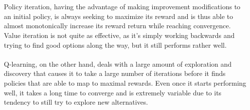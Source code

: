 \documentclass[h]{article}
\begin{document}
\\ \\
Policy iteration, having the advantage of making improvement modifications to an 
initial policy, is always seeking to maximize its reward and is thus able to 
almost monotonically increase its reward return while reaching convergence.  
Value iteration is not quite as effective, as it's simply working backwards and 
trying to find good options along the way, but it still performs rather well.  
\\ \\
Q-learning, on the other hand, deals with a large amount of exploration and 
discovery that causes it to take a large number of iterations before it finds 
policies that are able to map to maximal rewards.  Even once it starts 
performing well, it takes a long time to converge and is extremely variable due 
to its tendency to still try to explore new alternatives.
\end{document}
